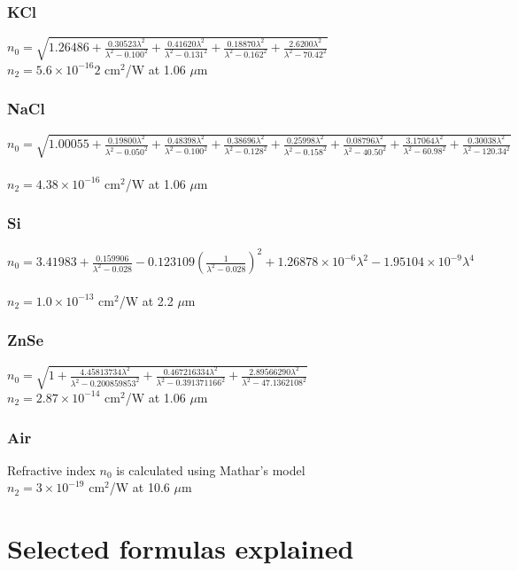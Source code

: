 \documentclass{report}
\begin{document}
\begin{appendices}
\subsection*{KCl}
$n_0=\sqrt{1.26486+\frac{0.30523\lambda^2}{\lambda^2-0.100^2}+\frac{0.41620\lambda^2}{\lambda^2-0.131^2}+\frac{0.18870\lambda^2}{\lambda^2-0.162^2}+\frac{2.6200\lambda^2}{\lambda^2-70.42^2}}$ \cite{Li-1976}\\
$n_2 = 5.6 \times 10^{-16}2$ cm$^2$/W at 1.06 $\mu$m \cite{Sheik-Bahae-1991}
\subsection*{NaCl}
$n_0=\sqrt{1.00055+\frac{0.19800\lambda^2}{\lambda^2-0.050^2}+\frac{0.48398\lambda^2}{\lambda^2-0.100^2}+\frac{0.38696\lambda^2}{\lambda^2-0.128^2}+\frac{0.25998\lambda^2}{\lambda^2-0.158^2}+\frac{0.08796\lambda^2}{\lambda^2-40.50^2}+\frac{3.17064\lambda^2}{\lambda^2-60.98^2}+\frac{0.30038\lambda^2}{\lambda^2-120.34^2}}$ \cite{Li-1976}\\
$n_2 = 4.38\times 10^{-16}$ cm$^2$/W at 1.06 $\mu$m \cite{Sheik-Bahae-1991}
\subsection*{Si}
$n_0=3.41983+\frac{0.159906}{\lambda^2-0.028}-0.123109\left(\frac{1}{\lambda^2-0.028}\right)^2+1.26878\times 10^{-6}\lambda^2-1.95104\times 10^{-9}\lambda^4$ \cite{Edwards-1980}\\
$n_2 = 1.0\times 10^{-13}$ cm$^2$/W at 2.2 $\mu$m \cite{Bristow-2007}
\subsection*{ZnSe}
$n_0=\sqrt{1+\frac{4.45813734\lambda^2}{\lambda^2-0.200859853^2}+\frac{0.467216334\lambda^2}{\lambda^2-0.391371166^2}+\frac{2.89566290\lambda^2}{\lambda^2-47.1362108^2}}$ \cite{Tatian-1984}\\
$n_2 = 2.87\times 10^{-14}$ cm$^2$/W at 1.06 $\mu$m \cite{Sheik-Bahae-1991}
\subsection*{Air}
Refractive index $n_0$ is calculated using Mathar's model \cite{Mathar-2007}\\
$n_2 = 3\times 10^{-19}$ cm$^2$/W at 10.6 $\mu$m


\chapter{Selected formulas explained}
\label{appendix:formulas_explained}



\end{appendices}
\end{document}
